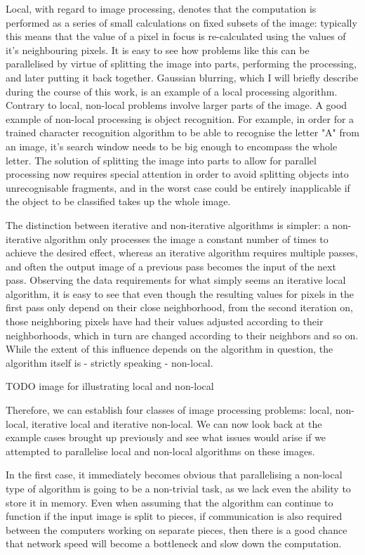 \documentclass [12pt,a4paper]{report}
\begin{document}
Local, with regard to image processing, denotes that the computation is performed as a series of small calculations on fixed subsets of the image: typically this means that the value of a pixel in focus is re-calculated using the values of it's neighbouring pixels. It is easy to see how problems like this can be parallelised by virtue of splitting the image into parts, performing the processing, and later putting it back together. Gaussian blurring, which I will briefly describe during the course of this work, is an example of a local processing algorithm. Contrary to local, non-local problems involve larger parts of the image. A good example of non-local processing is object recognition. For example, in order for a trained character recognition algorithm to be able to recognise the letter "A" from an image, it's search window needs to be big enough to encompass the whole letter. The solution of splitting the image into parts to allow for parallel processing now requires special attention in order to avoid splitting objects into unrecognisable fragments, and in the worst case could be entirely inapplicable if the object to be classified takes up the whole image. 

The distinction between iterative and non-iterative algorithms is simpler: a non-iterative algorithm only processes the image a constant number of times to achieve the desired effect, whereas an iterative algorithm requires multiple passes, and often the output image of a previous pass becomes the input of the next pass. Observing the data requirements for what simply seems an iterative local algorithm, it is easy to see that even though the resulting values for pixels in the first pass only depend on their close neighborhood, from the second iteration on, those neighboring pixels have had their values adjusted according to their neighborhoods, which in turn are changed according to their neighbors and so on. While the extent of this influence depends on the algorithm in question, the algorithm itself is - strictly speaking - non-local.

TODO image for illustrating local and non-local

Therefore, we can establish four classes of image processing problems: local, non-local, iterative local and iterative non-local. We can now look back at the example cases brought up previously and see what issues would arise if we attempted to parallelise local and non-local algorithms on these images.



In the first case, it immediately becomes obvious that parallelising a non-local type of algorithm is going to be a non-trivial task, as we lack even the ability to store it in memory. Even when assuming that the algorithm can continue to function if the input image is split to pieces, if communication is also required between the computers working on separate pieces, then there is a good chance that network speed will become a bottleneck and slow down the computation.
\end{document}
